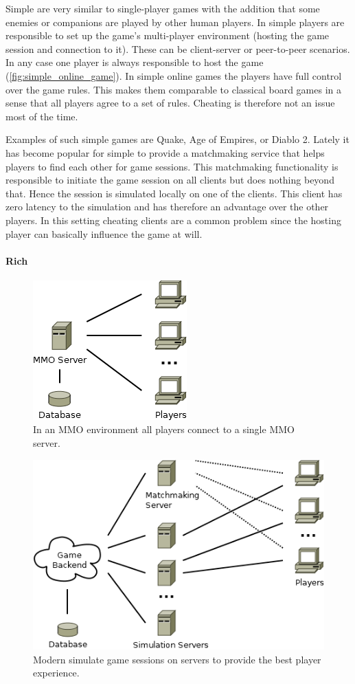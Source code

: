 Simple \ogs{} are very similar to single-player games with the addition that
some enemies or companions are played by other human players. In simple \ogs{}
players are responsible to set up the game's multi-player environment (hosting
the game session and connection to it). These can be client-server or
peer-to-peer scenarios. In any case one player is always responsible to host the
game (\autoref{fig:simple_online_game}). In simple online games the players have
full control over the game rules. This makes them comparable to classical board
games in a sense that all players agree to a set of rules. Cheating is therefore
not an issue most of the time.

Examples of such simple games are Quake, Age of Empires, or Diablo 2. Lately it
has become popular for simple \ogs{} to provide a matchmaking service that helps
players to find each other for game sessions. This matchmaking functionality is
responsible to initiate the game session on all clients but does nothing beyond
that. Hence the session is simulated locally on one of the clients. This client
has zero latency to the simulation and has therefore an advantage over the other
players. In this setting cheating clients are a common problem since the hosting
player can basically influence the game at will.

\newpage
\paragraph{Rich \ogs{}}

\begin{figure}
  \centering
  \includegraphics[width=.36\linewidth]{images/MMO}
  \caption{In an MMO environment all players connect to a single MMO server.}
  \label{fig:mmo}
\end{figure}
\begin{figure}
  \centering
  \includegraphics[width=.76\linewidth]{images/RichOnlineGame}
  \caption{Modern \og{} simulate game sessions on servers to provide the best
  player experience.}
  \label{fig:rich_online_game}
\end{figure}

